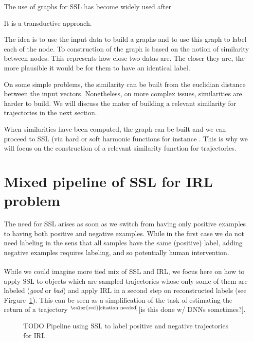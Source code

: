 \documentclass{article}
\newcommand{\needcite}{${}^{\text{\color{red}[citation needed]}}$}
\begin{document}
The use of graphs for SSL has become widely used after \cite{Zhu03}

It is a transductive approach. \cite{chapelle09}

The idea is to use the input data to build a graphs and to use this graph to label each of the node. To construction of the graph is based on the notion of similarity between nodes. This represents how close two datas are. The closer they are, the more plausible it would be for them to have an identical label.

On some simple problems, the similarity can be built from the euclidian distance between the input vectors. Nonetheless, on more complex issues, similarities are harder to build. We will discuss the mater of building a relevant similarity for trajectories in the next section.

When similarities have been computed, the graph can be built and we can proceed to SSL (via hard or soft harmonic functions for instance \cite{doyle84}. This is why we will focus on the construction of a relevant similarity function for trajectories.

\section{Mixed pipeline of SSL for IRL problem \label{sec:combine}}

The need for SSL arises as soon as we switch from having only positive examples to having both positive and negative examples. While in the first case we do not need labeling in the sens that all samples have the same (positive) label, adding negative examples requires labeling, and so potentially human intervention.

\paragraph{}
While we could imagine more tied mix of SSL and IRL, we focus here on how to apply SSL to objects which are sampled trajectories whose only some of them are labeled (\emph{good} or \emph{bad}) and apply IRL in a second step on reconstructed labels (see Firgure~\ref{fig:pipeline}). This can be seen as a simplification of the task of estimating the return of a trajectory \needcite [is this done w/ DNNs sometimes?].

\begin{figure}
\caption{TODO Pipeline using SSL to label positive and negative trajectories for IRL\label{fig:pipeline}}
\end{figure}
\end{document}
